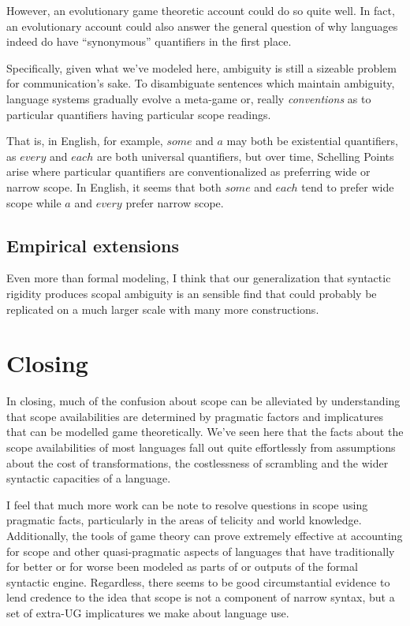 \documentclass{article}
\begin{document}
However, an evolutionary game theoretic account \parencite{maynardsmith73} could do so quite well.
In fact, an evolutionary account could also answer the general question of why languages indeed do have ``synonymous'' quantifiers in the first place.

Specifically, given what we've modeled here, ambiguity is still a sizeable problem for communication's sake.
To disambiguate sentences which maintain ambiguity, language systems gradually evolve a meta-game or, really \emph{conventions} as to particular quantifiers having particular scope readings.

That is, in English, for example, $some$ and $a$ may both be existential quantifiers, as $every$ and $each$ are both universal quantifiers, but over time, Schelling Points arise where particular quantifiers are conventionalized as preferring wide or narrow scope.
In English, it seems that both $some$ and $each$ tend to prefer wide scope while $a$ and $every$ prefer narrow scope.

\subsection{Empirical extensions}

Even more than formal modeling, I think that our generalization that syntactic rigidity produces scopal ambiguity is an sensible find that could probably be replicated on a much larger scale with many more constructions.

\section{Closing}


In closing, much of the confusion about scope can be alleviated by understanding that scope availabilities are determined by pragmatic factors and implicatures that can be modelled game theoretically. We've seen here that the facts about the scope availabilities of most languages fall out quite effortlessly from assumptions about the cost of transformations, the costlessness of scrambling and the wider syntactic capacities of a language.

I feel that much more work can be note to resolve questions in scope using pragmatic facts, particularly in the areas of telicity and world knowledge.
Additionally, the tools of game theory can prove extremely effective at accounting for scope and other quasi-pragmatic aspects of languages that have traditionally for better or for worse been modeled as parts of or outputs of the formal syntactic engine.
Regardless, there seems to be good circumstantial evidence to lend credence to the idea that scope is not a component of narrow syntax, but a set of extra-UG implicatures we make about language use.
\end{document}

